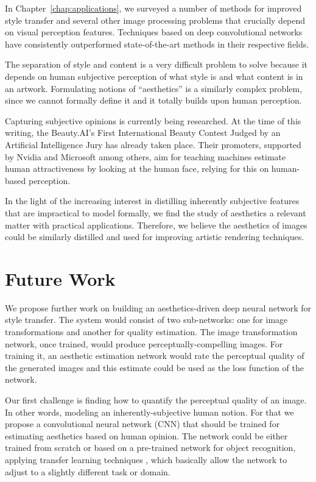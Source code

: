 In Chapter~\ref{chap:applications}, we surveyed a number of methods for improved style transfer and several other image processing problems that crucially depend on visual perception features.
Techniques based on deep convolutional networks have consistently outperformed state-of-the-art methods in their respective fields.

The separation of style and content is a very difficult problem to solve because it depends on human subjective perception of what style is and what content is in an artwork.
Formulating notions of ``aesthetics'' is a similarly complex problem, since we cannot formally define it and it totally builds upon human perception.

Capturing subjective opinions is currently being researched.
At the time of this writing, the Beauty.AI's First International Beauty Contest Judged by an Artificial Intelligence Jury \cite{YouthLaboratories} has already taken place.
Their promoters, supported by Nvidia and Microsoft among others, aim for teaching machines estimate human attractiveness by looking at the human face, relying for this on human-based perception.

In the light of the increasing interest in distilling inherently subjective features that are impractical to model formally, we find the study of aesthetics a relevant matter with practical applications.
Therefore, we believe the aesthetics of images could be similarly distilled and used for improving artistic rendering techniques.



\section{Future Work}
\label{sec:conclusion:future}

We propose further work on building an aesthetics-driven deep neural network for style transfer.
The system would consist of two sub-networks: one for image transformations and another for quality estimation.
The image transformation network, once trained, would produce perceptually-compelling images.
For training it, an aesthetic estimation network would rate the perceptual quality of the generated images and this estimate could be used as the loss function of the network.

Our first challenge is finding how to quantify the perceptual quality of an image.
In other words, modeling an inherently-subjective human notion.
For that we propose a convolutional neural network (CNN) that should be trained for estimating aesthetics based on human opinion.
The network could be either trained from scratch or based on a pre-trained network for object recognition, applying transfer learning techniques \cite{Pan2010}, which basically allow the network to adjust to a slightly different task or domain.

